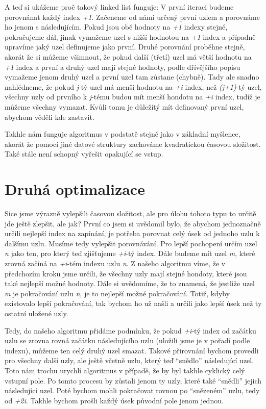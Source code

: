 \documentclass{../../../ksp}
\begin{document}
A teď si ukážeme proč takový linked list funguje:
V první iteraci budeme porovnánat každý index \emph{+1}. Začeneme od námi určený první uzlem a porovnáme ho jenom s následujícím.
Pokud jsou obě hodnoty na \emph{+1} indexy stejné, pokračujeme dál, jinak vymažeme uzel s nižší hodnotou na \emph{+1} index a případně upravíme jaký uzel definujeme jako první.
Druhé porovnání proběhne stejně, akorát že si můžeme všimnout, že pokud další (třetí) uzel má větší hodnotu na \emph{+1} index a první a druhý uzel mají stejné hodnoty,
podle dřívějšího popisu vymažeme jenom druhý uzel a první uzel tam zůstane (chybně). Tady ale snadno nahlédneme, že pokud \emph{j}-tý uzel má menší hodnotu na \emph{+i} index,
než \emph{(j+1)}-tý uzel, všechny uzly od prvního k \emph{j}-tému budou mít menší hondotu na \emph{+i} index, tudíž je můžeme všechny vymazat.
Kvůli tomu je důležítý mít definovaný první uzel, abychom věděli kde zastavit.

Takhle nám funguje algoritmus v podstatě stejně jako v základní myšlence, akorát že pomocí jiné datové struktury zachováme kvadratickou časovou složitost.
Také stále není schopný vyřešit opakující se vstup.

\section*{Druhá optimalizace}

Sice jsme výrazně vylepšili časovou složitost, ale pro úlohu tohoto typu to určitě jde ještě zlepšit, ale jak?
První co jsem si uvědomil bylo, že abychom jednoznačně určili nejlepší index na zapínání, je potřeba porovnat celý úsek od jednoho uzlu k dalšímu uzlu.
Musíme tedy vylepšit porovnávání. Pro lepší pochopení určím uzel \emph{n} jako ten, pro který teď zjišťujeme \emph{+i}-tý index.
Dále budeme mít uzel \emph{m}, které zrovná začíná na \emph{+i}-tém indexu uzlu \emph{n}.
Z našeho algoritmu víme, že v předchozím kroku jsme určili, že všechny uzly mají stejné hondoty, které jsou také nejlepší možné hodnoty.
Dále si uvědomíme, že to znamená, že jestliže uzel \emph{m} je pokračování uzlu \emph{n}, je to nejlepší možné pokračování.
Totiž, kdyby existovalo lepší pokračování, tak bychom ho už našli a určili jako lepší úsek než ty ostatní uložené uzly.

Tedy, do našeho algoritmu přidáme podmínku, že pokud \emph{+i}-tý index od začátku uzlu se zrovna rovná začátku následujícího uzlu (uložili jsme je v pořadí podle indexu),
můžeme ten celý druhý uzel smazat. Takové přirovnání bychom provedli pro všechny další uzly, ale ještě včetně uzlu, který teď ``snědlo'' následující uzel.
Toto nám trochu urychlí algoritmus v případě, že by byl takhle cyklický celý vstupní pole.
Po tomto procesu by zůstali jenom ty uzly, které také ``snědli'' jejich následující uzel.
Poté bychom mohli pokračovat rovnou po ``snězeném'' uzlu, tedy od \emph{+2i}. Takhle bychom prošli každý úsek původní pole jenom jednou.
\end{document}
